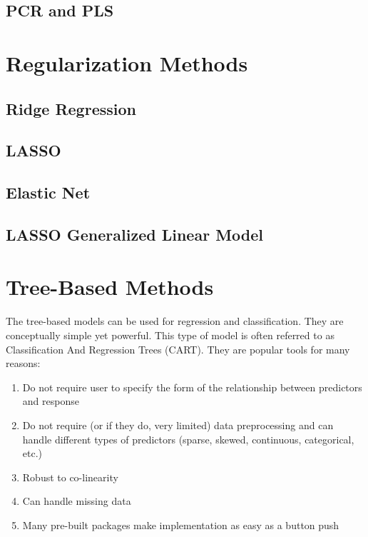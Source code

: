 \documentclass[12pt,]{krantz}
\providecommand{\tightlist}{%
  \setlength{\itemsep}{0pt}\setlength{\parskip}{0pt}}
\theoremstyle{definition}
\theoremstyle{definition}
\theoremstyle{definition}
\theoremstyle{remark}
\begin{document}
\section{PCR and PLS}\label{pcr-and-pls}

\chapter{Regularization Methods}\label{regularization-methods}

\section{Ridge Regression}\label{ridge-regression}

\section{LASSO}\label{lasso}

\section{Elastic Net}\label{elastic-net}

\section{LASSO Generalized Linear
Model}\label{lasso-generalized-linear-model}

\chapter{Tree-Based Methods}\label{tree-based-methods}

The tree-based models can be used for regression and classification.
They are conceptually simple yet powerful. This type of model is often
referred to as Classification And Regression Trees (CART). They are
popular tools for many reasons:

\begin{enumerate}
\def\labelenumi{\arabic{enumi}.}
\tightlist
\item
  Do not require user to specify the form of the relationship between
  predictors and response
\item
  Do not require (or if they do, very limited) data preprocessing and
  can handle different types of predictors (sparse, skewed, continuous,
  categorical, etc.)
\item
  Robust to co-linearity
\item
  Can handle missing data
\item
  Many pre-built packages make implementation as easy as a button push
\end{enumerate}
\end{document}
